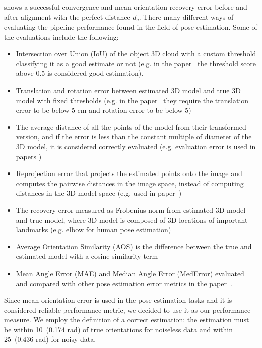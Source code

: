  shows a successful convergence and mean orientation recovery error before and after alignment with the perfect distance $d_q$. 
There many different ways of evaluating the pipeline performance found in the field of pose estimation. Some of the evaluations include the following:
\begin{itemize}
\item Intersection over Union (IoU) of the object 3D cloud with a custom threshold classifying it as a good estimate or not (e.g. in the paper~\cite{10.1007/s11263-014-0733-5} the threshold score above 0.5 is considered good estimation).
\item Translation and rotation error between estimated 3D model and true 3D model with fixed thresholds (e.g. in the paper~\cite{shotton2013scene} they require the translation error to be below 5 cm and rotation error to be below 5\degree)
\item The average distance of all the points of the model from their transformed version, and if the error is less than the constant multiple of diameter of the 3D model, it is considered correctly evaluated (e.g. evaluation error is used in papers \cite{10.1007/978-3-642-37331-2_42, xiang2018posecnn})
\item Reprojection error that projects the estimated points onto the image and computes the pairwise distances in the image space, instead of computing distances in the 3D model space (e.g. used in paper~\cite{xiang2018posecnn})
\item The recovery error measured as Frobenius norm from estimated 3D model and true model, where 3D model is composed of 3D locations of important landmarks (e.g. elbow for human pose estimation)~\cite{wangni2018monocular}
\item Average Orientation Similarity (AOS) is the difference between the true and estimated model with a cosine similarity term~\cite{RedondoCabrera2016PoseEE}
\item Mean Angle Error (MAE) and Median Angle Error (MedError) evaluated and compared with other pose estimation error metrics in the paper~\cite{RedondoCabrera2016PoseEE}.
\end{itemize}
Since mean orientation error is used in the pose estimation tasks and it is considered reliable performance metric, we decided to use it as our performance measure. We employ the definition of a correct estimation: the estimation must be within 10\degree~(0.174 rad) of true orientations for noiseless data and within 25\degree~(0.436 rad) for noisy data.

